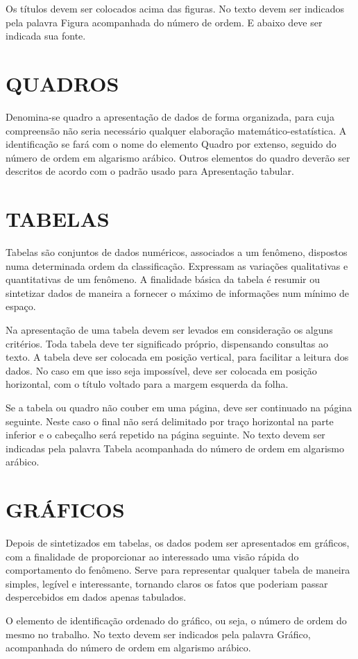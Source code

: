 Os títulos devem ser colocados acima das figuras. No texto devem
ser indicados pela palavra Figura acompanhada do número de ordem. E abaixo deve ser indicada sua fonte.

\section{QUADROS}

Denomina-se quadro a apresentação de dados de forma organizada, para cuja compreensão não seria necessário qualquer elaboração matemático-estatística. A identificação se fará com o nome do elemento Quadro por extenso, seguido do número de ordem em algarismo arábico. Outros elementos do quadro deverão ser descritos de acordo com o padrão usado para
Apresentação tabular.



\section{TABELAS}

Tabelas são conjuntos de dados numéricos, associados a um
fenômeno, dispostos numa determinada ordem da classificação. Expressam as variações qualitativas e quantitativas de um fenômeno. A finalidade básica da tabela é resumir ou sintetizar dados de maneira a fornecer o máximo de informações num mínimo de espaço.

Na apresentação de uma tabela devem ser levados em consideração
os alguns critérios. Toda tabela deve ter significado próprio, dispensando consultas ao texto. A tabela deve ser colocada em posição vertical, para facilitar a leitura dos dados. No caso em que isso seja impossível, deve ser colocada em posição horizontal, com o título voltado para a margem esquerda da folha.

Se a tabela ou quadro não couber em uma página, deve ser
continuado na página seguinte. Neste caso o final não será delimitado por traço horizontal na parte inferior e o cabeçalho será repetido na página seguinte. No texto devem ser indicadas pela palavra Tabela acompanhada do número de ordem em algarismo arábico.



\section{GRÁFICOS}

Depois de sintetizados em tabelas, os dados podem ser
apresentados em gráficos, com a finalidade de proporcionar ao interessado uma visão rápida do comportamento do fenômeno. Serve para representar qualquer tabela de maneira simples, legível e interessante, tornando claros os fatos que poderiam passar despercebidos em dados apenas tabulados.

O elemento de identificação ordenado do gráfico, ou seja, o
número de ordem do mesmo no trabalho. No texto devem ser indicados pela palavra Gráfico, acompanhada do número de ordem em algarismo arábico.
